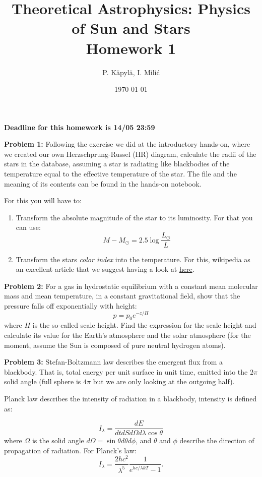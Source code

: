 \documentclass[12pt]{article}
\title{Theoretical Astrophysics: Physics of Sun and Stars\\
Homework 1}
\author{P. K\"{a}pyl\"{a}, I. Mili\'{c}}
\date{\today}
\begin{document}
\maketitle

\textbf{Deadline for this homework is 14/05 23:59}



{\bf Problem 1:} Following the exercise we did at the introductory hands-on, where we created our own Herzschprung-Russel (HR) diagram, calculate the radii of the stars in the database, assuming a star is radiating like blackbodies of the temperature equal to the effective temperature of the star. The file and the meaning of its contents can be found in the hands-on notebook.

For this you will have to: 
\begin{enumerate}
  \item Transform the absolute magnitude of the star to its luminosity. For that you can use: 
  \begin{equation}
  M - M_{\odot} = 2.5\log\frac{L_{\odot}}{L}
  \end{equation}

  \item Transform the stars \emph{color index} into the temperature. For this, wikipedia as an excellent article that we suggest having a look at \href{https://en.wikipedia.org/wiki/Color_index}{here}.

\end{enumerate}

{\bf Problem 2:} For a gas in hydrostatic equilibrium with a constant mean molecular mass and mean temperature, in a constant gravitational field, show that the pressure falls off exponentially with height: 
\begin{equation}
p = p_0 e^{-z/H}
\end{equation}
where $H$ is the so-called scale height. Find the expression for the scale height and calculate its value for the Earth's atmosphere and the solar atmosphere (for the moment, assume the Sun is composed of pure neutral hydrogen atoms).

{\bf Problem 3:} Stefan-Boltzmann law describes the emergent flux from a blackbody. That is, total energy per unit surface in unit time, emitted into the $2\pi$ solid angle (full sphere is $4\pi$ but we are only looking at the outgoing half).

Planck law describes the intensity of radiation in a blackbody, intensity is defined as: 

\begin{equation}
I_\lambda = \frac{dE}{dt dS d\Omega d\lambda \cos \theta}
\end{equation}
where $\Omega$ is the solid angle $d\Omega = \sin \theta d\theta d\phi$, and $\theta$ and $\phi$ describe the direction of propagation of radiation. For Planck's law:
\begin{equation}
I_\lambda = \frac{2hc^2}{\lambda^5} \frac{1}{e^{hc/\lambda k T} - 1}.
\end{equation}
\end{document}
